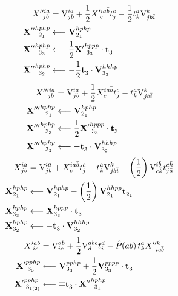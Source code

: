 \documentclass[thesis.tex]{subfiles}
\begin{document}
\begin{align}
  X''^{ia}_{\hspace{4.3pt} jb} &= \text{V}^{ia}_{jb} + \frac{1}{2}X'^{ia\bar{b}}_{\hspace{2.3pt} c}t^{c}_{j} - \frac{1}{2}t^{a}_{k}\text{V}^{k}_{jb\bar{i}} \notag \\
  \mathbf{X''}^{hphp}_{\hspace{4.3pt} 2_{1}} &\longleftarrow \text{\textbf{V}}^{hphp}_{2_{1}} \notag \\
  \mathbf{X''}^{hphp}_{\hspace{4.3pt} 3_{3}} &\longleftarrow \frac{1}{2}\mathbf{X'}^{hppp}_{\hspace{2.3pt} 3_{3}}\cdot\mathbf{t}^{}_{3} \notag \\
  \mathbf{X''}^{hphp}_{\hspace{4.3pt} 3_{2}} &\longleftarrow -\frac{1}{2}\mathbf{t}^{}_{3}\cdot\text{\textbf{V}}^{hhhp}_{3_{2}}
\end{align}
\begin{align}
  X'''^{ia}_{\hspace{6.3pt} jb} &= \text{V}^{ia}_{jb} + \frac{1}{2}X^{ia\bar{b}}_{\hspace{0.3pt} c}t^{c}_{j} - t^{a}_{k}\text{V}^{k}_{jb\bar{i}} \notag \\
  \mathbf{X'''}^{hphp}_{\hspace{6.3pt} 2_{1}} &\longleftarrow \text{\textbf{V}}^{hphp}_{2_{1}} \notag \\
  \mathbf{X'''}^{hphp}_{\hspace{6.3pt} 3_{3}} &\longleftarrow \frac{1}{2}\mathbf{X'}^{hppp}_{\hspace{2.3pt} 3_{3}}\cdot\mathbf{t}^{}_{3} \notag \\
  \mathbf{X'''}^{hphp}_{\hspace{6.3pt} 3_{2}} &\longleftarrow -\mathbf{t}^{}_{3}\cdot\text{\textbf{V}}^{hhhp}_{3_{2}}
\end{align}
\begin{align}
  X^{ia}_{\hspace{0.3pt} jb} &= \text{V}^{ia}_{jb} + X^{ia\bar{b}}_{\hspace{0.3pt} c}t^{c}_{j} - t^{a}_{k}\text{V}^{k}_{jb\bar{i}} - \left(\frac{1}{2}\right)\text{V}^{i\bar{b}}_{c\bar{k}}t^{c\bar{k}}_{j\bar{a}} \notag \\
  \mathbf{X}^{hphp}_{\hspace{0.3pt} 2_{1}} &\longleftarrow \text{\textbf{V}}^{hphp}_{2_{1}} - \left(\frac{1}{2}\right)\text{\textbf{V}}^{hhpp}_{2_{1}}\mathbf{t}^{}_{2_{1}} \notag \\
  \mathbf{X}^{hphp}_{\hspace{0.3pt} 3_{3}} &\longleftarrow \mathbf{X}^{hppp}_{\hspace{0.3pt} 3_{3}}\cdot\mathbf{t}^{}_{3} \notag \\
  \mathbf{X}^{hphp}_{\hspace{0.3pt} 3_{2}} &\longleftarrow -\mathbf{t}^{}_{3}\cdot\text{\textbf{V}}^{hhhp}_{3_{2}}
\end{align}
\begin{align}
  X'^{ab}_{\hspace{2.3pt} ic} &= \text{V}^{ab}_{ic} + \frac{1}{2}\text{V}^{ab\bar{c}}_{d}t^{d}_{i} - \mathop{\hat{P}\hspace{-2pt}\left( ab\right) }t^{a}_{k}X''^{k}_{\hspace{4.3pt} ic\bar{b}} \notag \\
  \mathbf{X'}^{pphp}_{\hspace{2.3pt} 3_{3}} &\longleftarrow \text{\textbf{V}}^{pphp}_{3_{3}} + \frac{1}{2}\text{\textbf{V}}^{pppp}_{3_{3}}\cdot\mathbf{t}^{}_{3} \notag \\
  \mathbf{X'}^{pphp}_{\hspace{2.3pt} 3_{1(2)}} &\longleftarrow \mp\mathbf{t}^{}_{3}\cdot\mathbf{X''}^{hphp}_{\hspace{4.3pt} 3_{1}}
\end{align}
\end{document}
